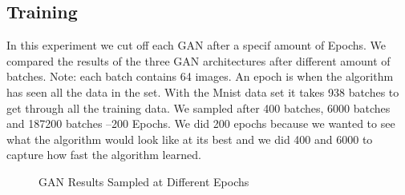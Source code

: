\documentclass[12pt,
 reprint,
nofootinbib,
 amsmath,amssymb,
 aps,
floatfix,
]{revtex4-2}
\begin{document}
\subsection{\label{sec:expTime}Training}

In this experiment we cut off each GAN after a specif amount of Epochs. We compared the results of the three GAN architectures after different amount of batches. Note: each batch contains 64 images. An epoch is when the algorithm has seen all the data in the set. With the Mnist data set it takes 938 batches to get through all the training data. We sampled after 400 batches, 6000 batches and 
187200 batches --200 Epochs. We did 200 epochs because we wanted to see what the algorithm would look like at its best and we did 400 and 6000 to capture how fast the algorithm learned.

\begin{figure}[h!]
    \centering
    \qquad
    \qquad
    \caption{GAN Results Sampled at Different Epochs}%
    \label{fig:ganResults}%
\end{figure}
\end{document}
